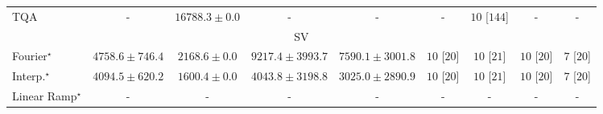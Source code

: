 \begin{tabular}{l|cccc|cccc|}
TQA & {\cellcolor[HTML]{000000}} \color[HTML]{F1F1F1} {\cellcolor{white}} \color{black} - & {\cellcolor[HTML]{7CC87B}} \color[HTML]{000000} $16788.3\pm 0.0$ & {\cellcolor[HTML]{000000}} \color[HTML]{F1F1F1} {\cellcolor{white}} \color{black} - & {\cellcolor[HTML]{000000}} \color[HTML]{F1F1F1} {\cellcolor{white}} \color{black} - & {\cellcolor[HTML]{000000}} \color[HTML]{F1F1F1} {\cellcolor{white}} \color{black} - & {\cellcolor[HTML]{49006A}} \color[HTML]{F1F1F1} $10$ [$144$] & {\cellcolor[HTML]{000000}} \color[HTML]{F1F1F1} {\cellcolor{white}} \color{black} - & {\cellcolor[HTML]{000000}} \color[HTML]{F1F1F1} {\cellcolor{white}} \color{black} - \\
\cline{1-9}
\multicolumn{9}{c}{\rule{0pt}{8pt}SV} \\
\midrule
Fourier$^\star$ & {\cellcolor[HTML]{96B6D7}} \color[HTML]{000000} $4758.6\pm 746.4$ & {\cellcolor[HTML]{F4EDF6}} \color[HTML]{000000} $2168.6\pm 0.0$ & {\cellcolor[HTML]{023858}} \color[HTML]{F1F1F1} $9217.4\pm 3993.7$ & {\cellcolor[HTML]{0569A5}} \color[HTML]{F1F1F1} $7590.1\pm 3001.8$ & {\cellcolor[HTML]{49006A}} \color[HTML]{F1F1F1} $10$ [$20$] & {\cellcolor[HTML]{49006A}} \color[HTML]{F1F1F1} $10$ [$21$] & {\cellcolor[HTML]{49006A}} \color[HTML]{F1F1F1} $10$ [$20$] & {\cellcolor[HTML]{CD238F}} \color[HTML]{F1F1F1} $7$ [$20$] \\
Interp.$^\star$ & {\cellcolor[HTML]{B7C5DF}} \color[HTML]{000000} $4094.5\pm 620.2$ & {\cellcolor[HTML]{FFF7FB}} \color[HTML]{000000} $1600.4\pm 0.0$ & {\cellcolor[HTML]{B8C6E0}} \color[HTML]{000000} $4043.8\pm 3198.8$ & {\cellcolor[HTML]{DFDDEC}} \color[HTML]{000000} $3025.0\pm 2890.9$ & {\cellcolor[HTML]{49006A}} \color[HTML]{F1F1F1} $10$ [$20$] & {\cellcolor[HTML]{49006A}} \color[HTML]{F1F1F1} $10$ [$21$] & {\cellcolor[HTML]{49006A}} \color[HTML]{F1F1F1} $10$ [$20$] & {\cellcolor[HTML]{CD238F}} \color[HTML]{F1F1F1} $7$ [$20$] \\
Linear Ramp$^\star$ & {\cellcolor[HTML]{000000}} \color[HTML]{F1F1F1} {\cellcolor{white}} \color{black} - & {\cellcolor[HTML]{000000}} \color[HTML]{F1F1F1} {\cellcolor{white}} \color{black} - & {\cellcolor[HTML]{000000}} \color[HTML]{F1F1F1} {\cellcolor{white}} \color{black} - & {\cellcolor[HTML]{000000}} \color[HTML]{F1F1F1} {\cellcolor{white}} \color{black} - & {\cellcolor[HTML]{000000}} \color[HTML]{F1F1F1} {\cellcolor{white}} \color{black} - & {\cellcolor[HTML]{000000}} \color[HTML]{F1F1F1} {\cellcolor{white}} \color{black} - & {\cellcolor[HTML]{000000}} \color[HTML]{F1F1F1} {\cellcolor{white}} \color{black} - & {\cellcolor[HTML]{000000}} \color[HTML]{F1F1F1} {\cellcolor{white}} \color{black} - \\

\end{tabular}
